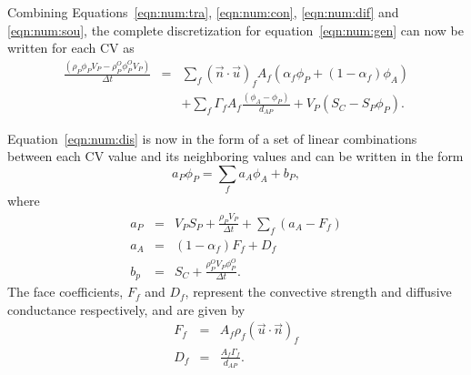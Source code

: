 Combining Equations~\eqref{eqn:num:tra}, \eqref{eqn:num:con},
\eqref{eqn:num:dif} and \eqref{eqn:num:sou}, the complete
discretization for equation~\eqref{eqn:num:gen} can now be written for
each CV as
\begin{eqnarray}
\frac{(\rho_{P} \phi_{P} V_P- \rho_P^O \phi_P^O V_P)}{\Delta t}
&=&
\sum_{f} (\vec{n} \cdot \vec{u})_f A_f (\alpha_f \phi_P +(1-\alpha_f)\phi_A)
\\
&&+
\sum_f \Gamma_f A_f \frac{(\phi_A-\phi_P)}{d_{AP}}
+ 
V_P ( S_C - S_P \phi_P ).
\label{eqn:num:dis}
\end{eqnarray}

Equation~\eqref{eqn:num:dis} is now in the form of a set of linear
combinations between each CV value and its neighboring values and can be
written in the form
\begin{equation}
a_P \phi_P = \sum_f a_{A} \phi_{A} + b_P,
\label{eqn:num:dap}
\end{equation}
where
\begin{eqnarray}
a_P & = & V_P S_P + \frac{\rho_P V_P}{\Delta t} + \sum_f (a_{A} - F_f) \\
a_{A} & = & ( 1 - \alpha_f ) F_f + D_f \\
b_p & = & S_C + \frac{\rho_P^O V_P \phi_P^O}{\Delta t}.
\end{eqnarray}
The face coefficients, $F_f$ and $D_f$, represent the convective strength
and diffusive conductance respectively, and are given by
\begin{eqnarray}
F_f & = & A_f \rho_f ( \vec{u} \cdot \vec{n} )_f \\
D_f & = & \frac{A_f \Gamma_f}{d_{AP}} .
\end{eqnarray}












